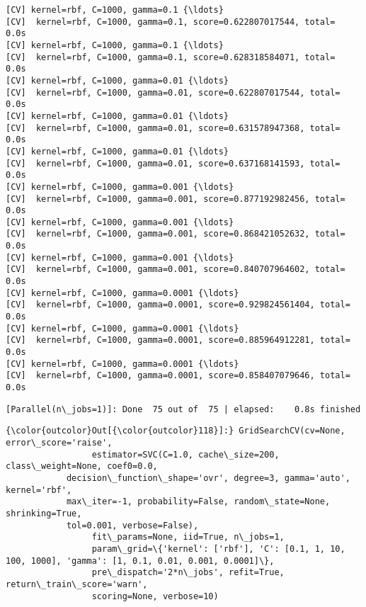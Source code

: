 \documentclass[11pt]{article}
\begin{document}
\begin{Verbatim}[commandchars=\\\{\}]
[CV] kernel=rbf, C=1000, gamma=0.1 {\ldots}
[CV]  kernel=rbf, C=1000, gamma=0.1, score=0.622807017544, total=   0.0s
[CV] kernel=rbf, C=1000, gamma=0.1 {\ldots}
[CV]  kernel=rbf, C=1000, gamma=0.1, score=0.628318584071, total=   0.0s
[CV] kernel=rbf, C=1000, gamma=0.01 {\ldots}
[CV]  kernel=rbf, C=1000, gamma=0.01, score=0.622807017544, total=   0.0s
[CV] kernel=rbf, C=1000, gamma=0.01 {\ldots}
[CV]  kernel=rbf, C=1000, gamma=0.01, score=0.631578947368, total=   0.0s
[CV] kernel=rbf, C=1000, gamma=0.01 {\ldots}
[CV]  kernel=rbf, C=1000, gamma=0.01, score=0.637168141593, total=   0.0s
[CV] kernel=rbf, C=1000, gamma=0.001 {\ldots}
[CV]  kernel=rbf, C=1000, gamma=0.001, score=0.877192982456, total=   0.0s
[CV] kernel=rbf, C=1000, gamma=0.001 {\ldots}
[CV]  kernel=rbf, C=1000, gamma=0.001, score=0.868421052632, total=   0.0s
[CV] kernel=rbf, C=1000, gamma=0.001 {\ldots}
[CV]  kernel=rbf, C=1000, gamma=0.001, score=0.840707964602, total=   0.0s
[CV] kernel=rbf, C=1000, gamma=0.0001 {\ldots}
[CV]  kernel=rbf, C=1000, gamma=0.0001, score=0.929824561404, total=   0.0s
[CV] kernel=rbf, C=1000, gamma=0.0001 {\ldots}
[CV]  kernel=rbf, C=1000, gamma=0.0001, score=0.885964912281, total=   0.0s
[CV] kernel=rbf, C=1000, gamma=0.0001 {\ldots}
[CV]  kernel=rbf, C=1000, gamma=0.0001, score=0.858407079646, total=   0.0s

    \end{Verbatim}

    \begin{Verbatim}[commandchars=\\\{\}]
[Parallel(n\_jobs=1)]: Done  75 out of  75 | elapsed:    0.8s finished

    \end{Verbatim}

\begin{Verbatim}[commandchars=\\\{\}]
{\color{outcolor}Out[{\color{outcolor}118}]:} GridSearchCV(cv=None, error\_score='raise',
                 estimator=SVC(C=1.0, cache\_size=200, class\_weight=None, coef0=0.0,
            decision\_function\_shape='ovr', degree=3, gamma='auto', kernel='rbf',
            max\_iter=-1, probability=False, random\_state=None, shrinking=True,
            tol=0.001, verbose=False),
                 fit\_params=None, iid=True, n\_jobs=1,
                 param\_grid=\{'kernel': ['rbf'], 'C': [0.1, 1, 10, 100, 1000], 'gamma': [1, 0.1, 0.01, 0.001, 0.0001]\},
                 pre\_dispatch='2*n\_jobs', refit=True, return\_train\_score='warn',
                 scoring=None, verbose=10)
\end{Verbatim}
            
\end{document}
